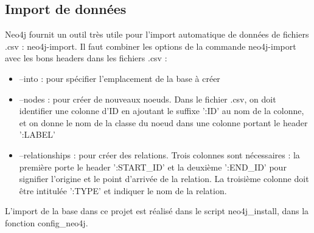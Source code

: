 \subsection{Import de données}

Neo4j fournit un outil très utile pour l'import automatique de données de fichiers .csv : neo4j-import. Il faut combiner les options de la commande neo4j-import avec les bons headers dans les fichiers .csv :

\begin{itemize}
      \item --into : pour spécifier l'emplacement de la base à créer
      \item --nodes : pour créer de nouveaux noeuds. Dans le fichier .csv, on doit identifier une colonne d'ID en ajoutant le suffixe ':ID' au nom de la colonne, et on donne le nom de la classe du noeud dans une colonne portant le header ':LABEL'
      \item --relationships : pour créer des relations. Trois colonnes sont nécessaires : la première porte le header ':START_ID' et la deuxième ':END_ID' pour signifier l'origine et le point d'arrivée de la relation. La troisième colonne doit être intitulée ':TYPE' et indiquer le nom de la relation.
\end{itemize}

L'import de la base dans ce projet est réalisé dans le script neo4j_install, dans la fonction config_neo4j.
